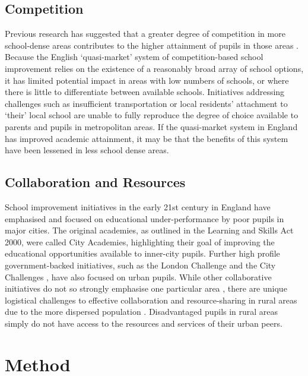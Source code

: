 \documentclass[12pt, a4paper]{article}
\begin{document}
\subsection{Competition}

Previous research has suggested that a greater degree of competition in more school-dense areas contributes to the higher attainment of pupils in those areas \autocites{bradley2001, bradley2002, bradley2010, gibbons2008a}. Because the English `quasi-market' \autocites{glennerster1991} system of competition-based school improvement relies on the existence of a reasonably broad array of school options, it has limited potential impact in areas with low numbers of schools, or where there is little to differentiate between available schools. Initiatives addressing challenges such as insufficient transportation \autocites{hammond1995, morgan2013} or local residents' attachment to `their' local school \autocites{walker2010c} are unable to fully reproduce the degree of choice available to parents and pupils in metropolitan areas. If the quasi-market system in England has improved academic attainment, it may be that the benefits of this system have been lessened in less school dense areas. 

\subsection{Collaboration and Resources}

School improvement initiatives in the early 21st century in England have emphasised and focused on educational under-performance by poor pupils in major cities. The original academies, as outlined in the Learning and Skills Act 2000, were called City Academies, highlighting their goal of improving the educational opportunities available to inner-city pupils. Further high profile government-backed initiatives, such as the London Challenge and the City Challenges \autocites{hutchings2012}, have also focused on urban pupils. While other collaborative initiatives do not so strongly emphasise one particular area \autocite[see][for a review of collaborative partnerships
and federations in England]{armstrong2015}, there are unique logistical challenges to effective collaboration and resource-sharing in rural areas due to the more dispersed population \autocite{muijs2008}. Disadvantaged pupils in rural areas simply do not have access to the resources and services of their urban peers. 

\section{Method}
\end{document}
